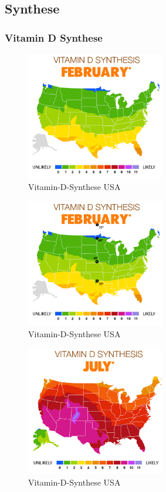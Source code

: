 \documentclass[xcolor=dvipsnames]{beamer}
\begin{document}
    \subsection{Synthese}
    \begin{frame}[allowframebreaks]
        \frametitle{Vitamin D Synthese}

        \begin{figure}
            \includegraphics[width=6cm]{../images/vitamin_d_map.png}
            \caption{Vitamin-D-Synthese USA}
        \end{figure}

        \framebreak

        \begin{figure}
            \includegraphics[width=6cm]{../images/vitamin_d_map_2.png}
            \caption{Vitamin-D-Synthese USA}
        \end{figure}

        \framebreak

        \begin{figure}
            \includegraphics[width=6cm]{../images/vitamin_d_map_3.png}
            \caption{Vitamin-D-Synthese USA}
        \end{figure}


\end{frame}
\end{document}
